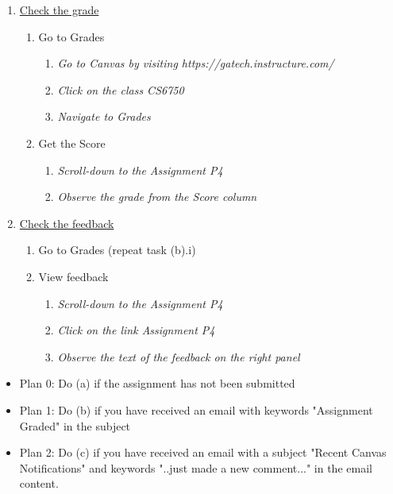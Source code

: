 \documentclass[12pt,letterpaper]{article}
\begin{document}
\begin{enumerate}
\begin{enumerate}
        \item \underline{Check the grade}
            \begin{enumerate}
                \item Go to Grades
                \begin{enumerate}
                    \item \textit{Go to Canvas by visiting https://gatech.instructure.com/}
                    \item \textit{Click on the class CS6750}
                    \item \textit{Navigate to Grades}
                \end{enumerate}
                \item Get the Score
                    \begin{enumerate}
                    \item \textit{Scroll-down to the Assignment P4}
                    \item \textit{Observe the grade from the Score column}
                \end{enumerate}
            \end{enumerate}
        \item \underline{Check the feedback}
            \begin{enumerate}
                \item Go to Grades (repeat task (b).i)
                \item View feedback
                    \begin{enumerate}
                        \item \textit{Scroll-down to the Assignment P4}
                        \item \textit{Click on the link Assignment P4}
                        \item \textit{Observe the text of the feedback on the right panel}
                \end{enumerate}
            \end{enumerate}
    \end{enumerate}
\end{enumerate}

\begin{itemize}
    \item Plan 0: Do (a) if the assignment has not been submitted
    \item Plan 1: Do (b) if you have received an email with keywords "Assignment Graded" in the subject
    \item Plan 2: Do (c) if you have received an email with a subject "Recent Canvas Notifications" and keywords "..just made a new comment..." in the email content. 
\end{itemize}
\end{document}
